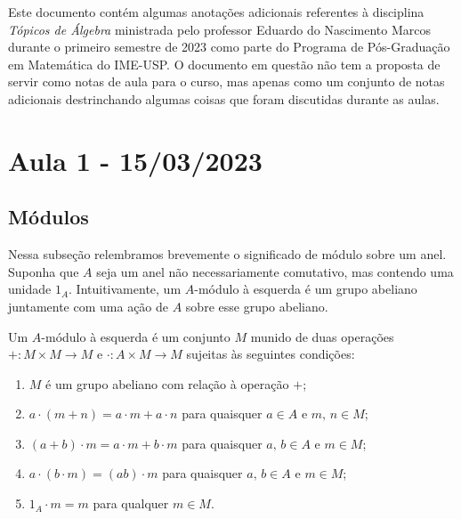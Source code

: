 



\maketitle

Este documento contém algumas anotações adicionais referentes à
disciplina \emph{Tópicos de Álgebra} ministrada pelo professor Eduardo
do Nascimento Marcos durante o primeiro semestre de 2023 como parte do
Programa de Pós-Graduação em Matemática do IME-USP.  O documento em
questão não tem a proposta de servir como notas de aula para o curso,
mas apenas como um conjunto de notas adicionais destrinchando algumas
coisas que foram discutidas durante as aulas.

\section{Aula 1 - 15/03/2023}

\subsection{Módulos}

Nessa subseção relembramos brevemente o significado de módulo sobre um anel.
Suponha que $A$ seja um anel não necessariamente comutativo, mas contendo uma unidade $1_A$.
Intuitivamente, um $A$-módulo à esquerda é um grupo abeliano juntamente com uma ação de $A$ sobre esse grupo abeliano.

\begin{defin}
  Um $A$-módulo à esquerda é um conjunto $M$ munido de duas operações $+: M \times M \to M$ e $\cdot: A \times M \to M$ sujeitas às seguintes condições:
  \begin{enumerate}
  \item $M$ é um grupo abeliano com relação à operação $+$;
    
  \item $a \cdot (m+n) = a \cdot m + a \cdot n$ para quaisquer $a  \in A$ e $m,\, n \in M$;
    
  \item $(a+b) \cdot m = a \cdot m + b \cdot m$ para quaisquer $a,\, b \in A$ e $m \in M$;
    
  \item $a \cdot (b \cdot m) = (ab) \cdot m$ para quaisquer $a,\, b \in A$ e $m \in M$;
    
  \item $1_A \cdot m = m$ para qualquer $m \in M$.
  \end{enumerate}
\end{defin}

